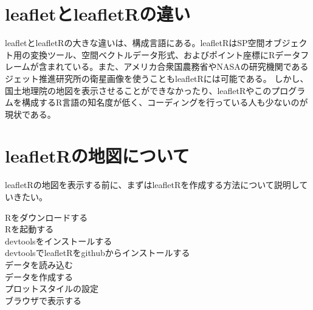 \documentclass[report]{jsbook}
\begin{document}
\section{leafletとleafletRの違い}
leafletとleafletRの大きな違いは、構成言語にある。leafletRはSP空間オブジェクト用の変換ツール、空間ベクトルデータ形式、およびポイント座標にRデータフレームが含まれている。また、アメリカ合衆国農務省やNASAの研究機関であるジェット推進研究所の衛星画像を使うこともleafletRには可能である。
しかし、国土地理院の地図を表示させることができなかったり、leafletRやこのプログラムを構成するR言語の知名度が低く、コーディングを行っている人も少ないのが現状である。
\section{leafletRの地図について}
leafletRの地図を表示する前に、まずはleafletRを作成する方法について説明していきたい。
\begin{description}
\item[Rをダウンロードする]
\item[Rを起動する]
\item[devtoolsをインストールする]
\item[devtoolsでleafletRをgithubからインストールする]
\item[データを読み込む]
\item[データを作成する]
\item[プロットスタイルの設定]
\item[ブラウザで表示する]
\end{description}
\end{document}
